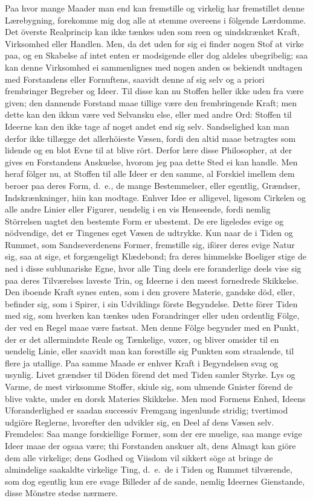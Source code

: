 \documentclass[12pt,a4paper]{article}
\newcommand{\opage}[1]{\marginnote{\footnotesize\textit{[#1]}}}
\begin{document}
Paa hvor mange Maader man end kan fremstille og virkelig har fremstillet
denne Lærebygning, forekomme mig dog alle at stemme overeens i fölgende
Lærdomme. Det överste Realprincip kan ikke tænkes uden som reen og
uindskrænket Kraft, Virksomhed eller Handlen. Men, da det uden for sig ei
finder nogen Stof at virke paa, og en Skabelse af intet enten er modsigende
eller dog aldeles ubegribelig; saa kan denne Virksomhed ei sammenlignes med
nogen anden os bekiendt undtagen med Forstandens eller Fornuftens, saavidt
denne af sig selv og a priori frembringer Begreber og Ideer. Til disse kan
nu Stoffen heller ikke uden fra være given; den dannende Forstand maae
tillige være den frembringende Kraft; men dette kan den ikkun være ved
Selvansku%
\opage{243}else, eller med andre Ord: Stoffen til Ideerne kan den ikke tage af noget
andet end sig selv. Sandselighed kan man derfor ikke tillægge det
allerhöieste Væsen, fordi den altid maae betragtes som lidende og en blot
Evne til at blive rört. Derfor lære disse Philosopher, at der gives en
Forstandens Anskuelse, hvorom jeg paa dette Sted ei kan handle. Men heraf
fölger nu, at Stoffen til alle Ideer er den samme, al Forskiel imellem dem
beroer paa deres Form, d.~e., de mange Bestemmelser, eller egentlig,
Grændser, Indskrænkninger, hiin kan modtage. Enhver Idee er alligevel,
ligesom Cirkelen og alle andre Linier eller Figurer, uendelig i en vis
Henseende, fordi nemlig Störrelsen uagtet den bestemte Form er ubestemt. De
ere ligeledes evige og nödvendige, det er Tingenes eget Væsen de udtrykke.
Kun naar de i Tiden og Rummet, som Sandseverdenens Former, fremstille sig,
iförer deres evige Natur sig, saa at sige, et forgængeligt Klædebond; fra
deres himmelske Boeliger stige de ned i disse sublunariske Egne, hvor alle
Ting deels ere foranderlige deels vise sig paa deres Tilværelses laveste
Trin, og Ideerne i den meest fornedrede Skikkelse. Den iboende Kraft synes
enten, som i den grovere Materie, gandske död, eller, befinder sig, som i
Spirer, i sin Udviklings förste Begyndelse. Dette förer Tiden med sig, som
hverken kan tænkes uden Forandringer eller uden ordentlig Fölge, der ved en
Regel maae være fastsat. Men denne Fölge begynder med en Punkt, der er det
allermindste Reale og Tænkelige, voxer, og bliver omsider til en uendelig
Linie, eller saavidt man kan forestille sig Punkten som straalende, til
flere ja utallige. Paa samme Maade er enhver Kraft i Begyndelsen svag og
usynlig. Livet grændser til Döden förend
\opage{244} det med Tiden samler Styrke. Lys og Varme, de mest virksomme Stoffer,
skiule sig, som ulmende Gnister förend de blive vakte, under en dorsk
Materies Skikkelse. Men mod Formens Enhed, Ideens Uforanderlighed er saadan
successiv Fremgang ingenlunde stridig; tvertimod udgiöre Reglerne,
hvorefter den udvikler sig, en Deel af dens Væsen selv. Fremdeles: Saa
mange forskiellige Former, som der ere muelige, saa mange evige Ideer maae
der ogsaa være; thi Forstanden anskuer alt, dens Almagt kan giöre dem alle
virkelige; dens Godhed og Viisdom vil sikkert söge at bringe de almindelige
saakaldte virkelige Ting, d.~e.\ de i Tiden og Rummet tilværende, som dog
egentlig kun ere svage Billeder af de sande, nemlig Ideernes Gienstande,
disse Mönstre stedse nærmere.
\end{document}
